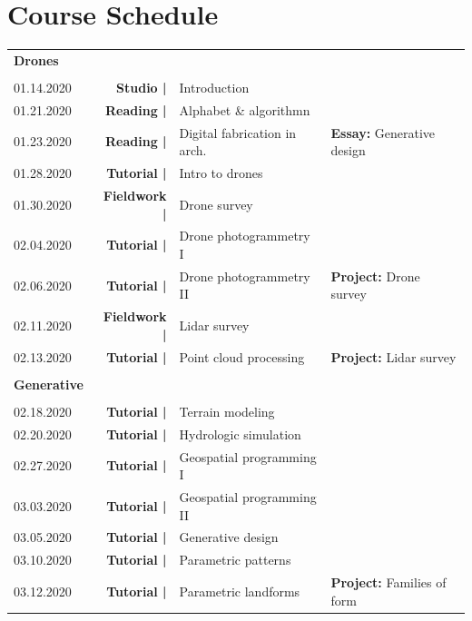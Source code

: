 \documentclass[11pt,article,oneside]{memoir}
\begin{document}
\clearpage

\section{Course Schedule}

\begin{table}[H]
\begin{tabular}{l r @{\hskip 0.1cm} l @{\hskip 0.5cm} l}
\\
\textbf{Drones}\\
\\
01.14.2020 & \textbf{Studio |} & Introduction \\
%
01.21.2020 & \textbf{Reading |} & Alphabet \& algorithmn \\
01.23.2020 & \textbf{Reading |} & Digital fabrication in arch. & \textbf{Essay:} Generative design \\
%
01.28.2020 & \textbf{Tutorial |} & Intro to drones \\
01.30.2020 & \textbf{Fieldwork |} & Drone survey \\
%
02.04.2020 & \textbf{Tutorial |} & Drone photogrammetry I \\
02.06.2020 & \textbf{Tutorial |} & Drone photogrammetry II & \textbf{Project:} Drone survey \\
%
02.11.2020 & \textbf{Fieldwork |} & Lidar survey \\
02.13.2020 & \textbf{Tutorial |} & Point cloud processing & \textbf{Project:} Lidar survey \\
\\
\textbf{Generative}\\
\\
02.18.2020 & \textbf{Tutorial |} & Terrain modeling \\
02.20.2020 & \textbf{Tutorial |} & Hydrologic simulation \\
%
02.27.2020 & \textbf{Tutorial |} & Geospatial programming I\\
%
03.03.2020 & \textbf{Tutorial |} & Geospatial programming II \\
03.05.2020 & \textbf{Tutorial |} & Generative design\\ 
%
03.10.2020 & \textbf{Tutorial |} & Parametric patterns \\
03.12.2020 & \textbf{Tutorial |} & Parametric landforms & \textbf{Project:} Families of form \\

\end{tabular}
\end{table}
\end{document}
